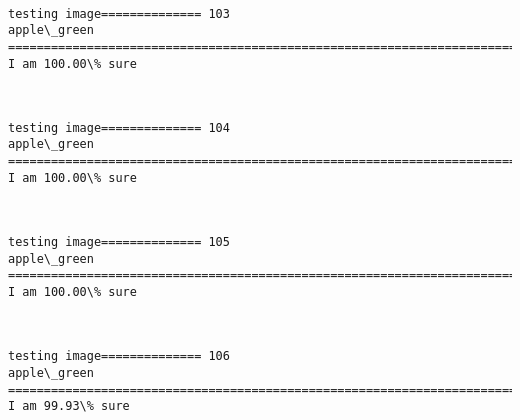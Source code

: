 \documentclass[11pt]{article}
\begin{document}
    \begin{center}
    \end{center}
    { \hspace*{\fill} \\}
    
    \begin{Verbatim}[commandchars=\\\{\}]
testing image============== 103
apple\_green
============================================================================
I am 100.00\% sure

    \end{Verbatim}

    \begin{center}
    \end{center}
    { \hspace*{\fill} \\}
    
    \begin{Verbatim}[commandchars=\\\{\}]
testing image============== 104
apple\_green
============================================================================
I am 100.00\% sure

    \end{Verbatim}

    \begin{center}
    \end{center}
    { \hspace*{\fill} \\}
    
    \begin{Verbatim}[commandchars=\\\{\}]
testing image============== 105
apple\_green
============================================================================
I am 100.00\% sure

    \end{Verbatim}

    \begin{center}
    \end{center}
    { \hspace*{\fill} \\}
    
    \begin{Verbatim}[commandchars=\\\{\}]
testing image============== 106
apple\_green
============================================================================
I am 99.93\% sure

    \end{Verbatim}
\end{document}
